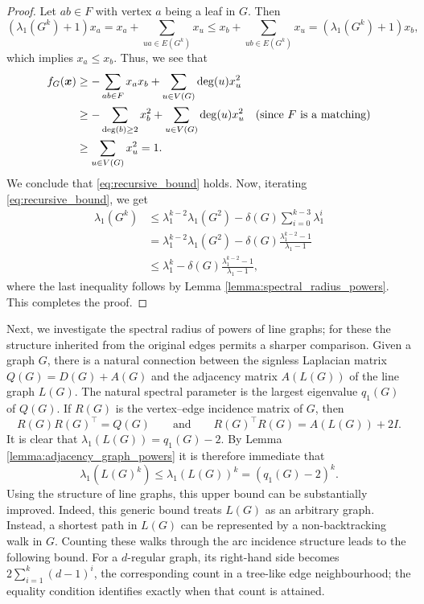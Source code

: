 \documentclass[10pt,a4paper]{article}
\theoremstyle{plain}
\numberwithin{equation}{section}
\def\x{\mbox{\boldmath $x$}}
\begin{document}
\begin{proof}
   Let $ab\in F$ with vertex $a$ being a leaf in $G$. Then 
   \[ (\lambda_1(G^k)+1)x_a = x_a + \sum_{ua \in E(G^k)} x_u \le x_b+\sum_{ub\in E(G^k)}x_u = (\lambda_1(G^k)+1)x_b,\]
   which implies $x_a\le x_b$. Thus, we see that 
   \begin{align*}
       f_G(\x) & \ge -\sum_{ab \in F}  x_ax_b + \sum_{u\in V(G)}\deg(u)x_u^2\\
       & \ge -\sum_{\deg(b)\ge 2}  x_b^2 + \sum_{u\in V(G)}\deg(u)x_u^2 \quad (\text{since $F$ is a matching})\\
       & \ge \sum_{u\in V(G)}x_u^2 = 1.
   \end{align*}
   We conclude that \eqref{eq:recursive_bound} holds. Now, iterating \eqref{eq:recursive_bound}, we get 
   \begin{align*}
       \lambda_1(G^k) & \le \lambda_1^{k-2}\lambda_1(G^2) - \delta(G)\sum_{i=0}^{k-3} \lambda_1^i \\
       & = \lambda_1^{k-2}\lambda_1(G^2) - \delta(G)\frac{\lambda_1^{k-2}-1}{\lambda_1-1}\\
       &\le \lambda_1^k - \delta(G)\frac{\lambda_1^{k-2}-1}{\lambda_1-1},
   \end{align*}
 where the last inequality follows by Lemma \ref{lemma:spectral_radius_powers}. This completes the proof.
\end{proof}


Next, we investigate the spectral radius of powers of line graphs; for these the structure inherited from the original edges permits a sharper comparison. Given a graph $G$, there is a natural connection between the signless Laplacian matrix $Q(G)=D(G)+A(G)$ and the adjacency matrix $A(L(G))$ of the line graph $L(G)$. The natural spectral parameter is the largest eigenvalue $q_1(G)$ of $Q(G)$. If $R(G)$ is the vertex--edge incidence matrix of $G$, then
\begin{equation}
    R(G)R(G)^\top = Q(G)\qquad \text{and}\qquad R(G)^\top R(G) = A(L(G)) + 2I.
\end{equation}
It is clear that $\lambda_1(L(G)) = q_1(G)-2$. By Lemma \ref{lemma:adjacency_graph_powers} it is therefore immediate that 
\begin{equation}
    \lambda_1(L(G)^k) \le \lambda_1(L(G))^k = (q_1(G)-2)^k.  
\end{equation}
Using the structure of line graphs, this upper bound can be substantially improved. Indeed, this generic bound treats $L(G)$ as an arbitrary graph. Instead, a shortest path in $L(G)$ can be represented by a non-backtracking walk in $G$. Counting these walks through the arc incidence structure leads to the following bound. For a $d$-regular graph, its right-hand side becomes $2\sum_{i=1}^k(d-1)^i$, the corresponding count in a tree-like edge neighbourhood; the equality condition identifies exactly when that count is attained.
\end{document}
